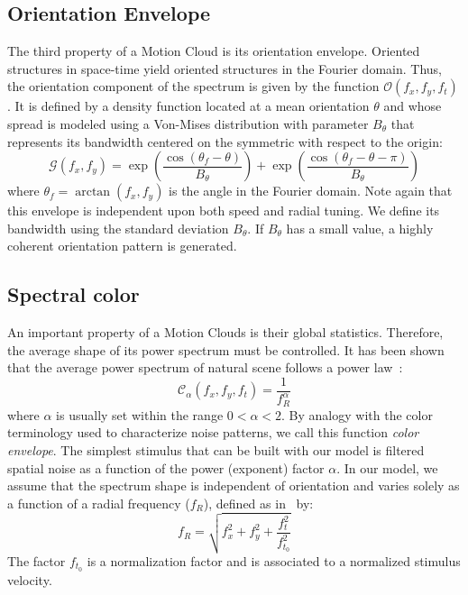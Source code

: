 \documentclass[a4paper,11pt]{article}%
\begin{document}
\subsection{Orientation Envelope}
The third property of a Motion Cloud is its orientation envelope. Oriented structures in space-time yield oriented structures in the Fourier domain. Thus, the orientation component of the spectrum is given by the function $\mathcal{O} (f_x, f_y, f_t)$. It  is defined by a density function located at a mean orientation $\theta$ and whose spread is modeled using a Von-Mises distribution with parameter $B_{\theta}$ that represents its bandwidth centered on the symmetric with respect to the origin:
\begin{equation}
\mathcal{G} (f_x, f_y)= \exp \left( \dfrac{\cos(\theta_f-\theta)}{B_{\theta}}\right) + \exp \left( \dfrac{\cos(\theta_f-\theta-\pi)}{B_{\theta}}\right)
\label{eq:envelope_direction}
\end{equation}
where $\theta_f=\arctan (f_x, f_y)$ is the angle in the Fourier domain. Note again that this envelope is independent upon both speed and radial tuning. We define its bandwidth using the standard deviation $B_{\theta}$. If $B_{\theta}$ has a small value, a highly coherent orientation pattern is generated. %

\subsection{Spectral color} %
An important property of a Motion Clouds is their global statistics. Therefore, the average shape of its power spectrum must be controlled. It has been shown that the average power spectrum of natural scene follows a power law~\citep{Field87}:
\begin{equation} %
\mathcal{C}_{\alpha}(f_{x}, f_{y}, f_{t}) = \dfrac{1}{f_{\mathit{R}}^\alpha}
\label{eq:powerlaw} %
\end{equation} %
where $\alpha$  is usually set within the range  $0 < \alpha < 2$. By analogy with the color terminology used to characterize noise patterns, we call this function \textit{color envelope}. The simplest stimulus that can be built with our model is filtered spatial noise as a function of the power (exponent) factor $\alpha$.
In our model, we assume that the spectrum shape is independent of orientation and varies solely as a function of a radial frequency ($f_{\mathit{R}}$), defined as in~\citep{Schrater00} by:  %
\begin{equation} %
  f_{\mathit{R}} = \sqrt{f_{x}^{2} + f_{y}^{2} + \dfrac{f_{t}^{2}}{f_{t_0}^{2}}}
  \label{eq:freq_radius} %
\end{equation} %
The factor $f_{t_0}$ is a normalization factor and is associated to a normalized stimulus velocity. %
\end{document}
